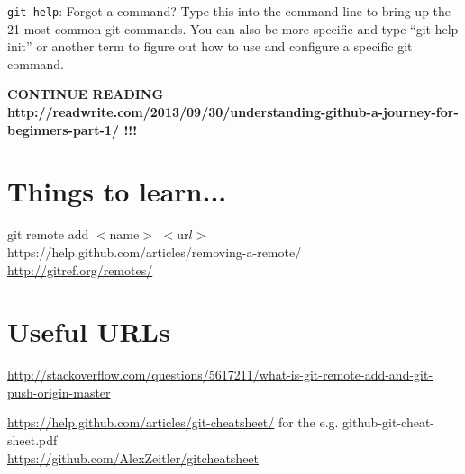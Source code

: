 \documentclass[11pt,a4paper]{article}
\begin{document}
\weeskip
{\tt git help}: Forgot a command? Type this into the command line to
bring up the 21 most common git commands. You can also be more
specific and type ``git help init'' or another term to figure out how
to use and configure a specific git command.

{\bf 
CONTINUE READING 
http://readwrite.com/2013/09/30/understanding-github-a-journey-for-beginners-part-1/
!!!
}
































\section{Things to learn...}
git remote add $<$name$>$ $<$ur$l>$\\

\noindent
https://help.github.com/articles/removing-a-remote/ \\

\noindent
\href{http://gitref.org/remotes/}{http://gitref.org/remotes/}\\




\section{Useful URLs}
\noindent
\href{http://stackoverflow.com/questions/5617211/what-is-git-remote-add-and-git-push-origin-master}{http://stackoverflow.com/questions/5617211/what-is-git-remote-add-and-git-push-origin-master}

\noindent
\href{https://help.github.com/articles/git-cheatsheet}{https://help.github.com/articles/git-cheatsheet/}
for the e.g. github-git-cheat-sheet.pdf \\

\noindent
\href{https://github.com/AlexZeitler/gitcheatsheet}{https://github.com/AlexZeitler/gitcheatsheet}
\end{document}
